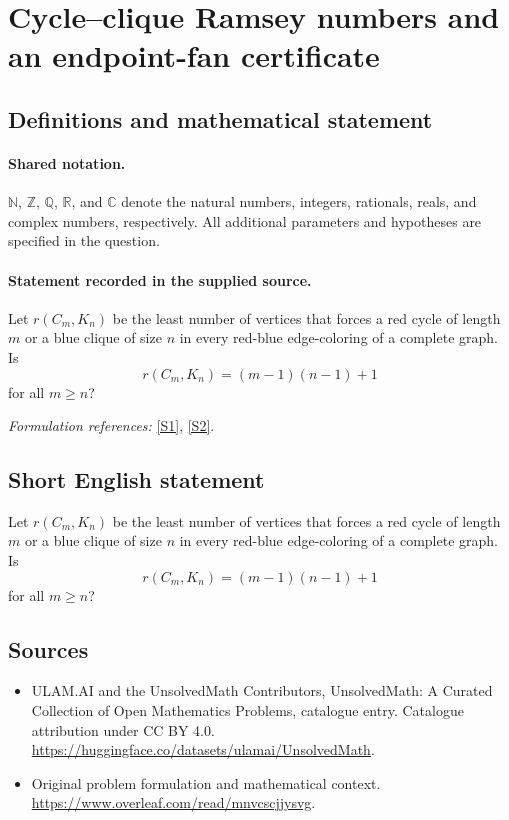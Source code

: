 \documentclass[11pt]{article}
\newcommand{\sref}[2]{\hyperlink{source:#1:#2}{[S#2]}}
\begin{document}
\section{Cycle--clique Ramsey numbers and an endpoint-fan certificate}\label{statement}

\subsection{Definitions and mathematical statement}

\paragraph{Shared notation.}$\mathbb N$, $\mathbb Z$, $\mathbb Q$, $\mathbb R$, and $\mathbb C$ denote the natural numbers, integers, rationals, reals, and complex numbers, respectively. All additional parameters and hypotheses are specified in the question.


\paragraph{Statement recorded in the supplied source.}
Let $r(C_m,K_n)$ be the least number of vertices that forces a red cycle of length $m$ or a blue clique of size $n$ in every red-blue edge-coloring of a complete graph. Is
\[r(C_m,K_n)=(m-1)(n-1)+1\]
for all $m\geq n$?
\par\smallskip\textit{Formulation references:} \sref{statement}{1}, \sref{statement}{2}.
\subsection{Short English statement}
Let $r(C_m,K_n)$ be the least number of vertices that forces a red cycle of length $m$ or a blue clique of size $n$ in every red-blue edge-coloring of a complete graph. Is
\[r(C_m,K_n)=(m-1)(n-1)+1\]
for all $m\geq n$?
\subsection{Sources}
\begin{itemize}
\item[\hypertarget{source:statement:1}{S1}] ULAM.AI and the UnsolvedMath Contributors, UnsolvedMath: A Curated Collection of Open Mathematics Problems, catalogue entry. Catalogue attribution under CC BY 4.0.
\url{https://huggingface.co/datasets/ulamai/UnsolvedMath}.
\item[\hypertarget{source:statement:2}{S2}] Original problem formulation and mathematical context.
\url{https://www.overleaf.com/read/mnvcscjjysvg}.
\end{itemize}
\label{end:statement}
\end{document}
